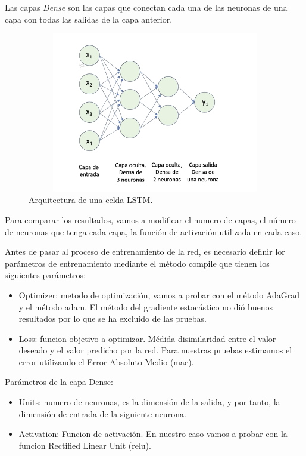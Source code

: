 \documentclass[11pt]{article} %
\begin{document}
Las capas \textit{Dense} son las capas que conectan cada una de las neuronas de una capa con todas las salidas de la capa anterior.

\begin{figure}[h!]
	\centering
	\includegraphics[width=12cm, height=7cm]{imdense1.png}
	\caption{Arquitectura de una celda LSTM.}
\end{figure}

Para comparar los resultados, vamos a modificar el numero de capas, el número de neuronas que tenga cada capa, la función de activación utilizada en cada caso.

Antes de pasar al proceso de entrenamiento de la red, es necesario definir lor parámetros de entrenamiento mediante el método compile que tienen los siguientes parámetros:
\begin{itemize}
	\item Optimizer: metodo de optimización, vamos a probar con el método AdaGrad y el método adam. El método del gradiente estocástico no dió buenos resultados por lo que se ha excluido de las pruebas.
	\item Loss: funcion objetivo a optimizar. Médida disimilaridad entre el valor deseado y el valor predicho por la red. Para nuestras pruebas estimamos el error utilizando el Error Absoluto Medio (mae).
\end{itemize}

Parámetros de la capa Dense:
\begin{itemize}
	\item Units: numero de neuronas, es la dimensión de la salida, y por tanto, la dimensión de entrada de la siguiente neurona.
	\item Activation: Funcion de activación. En nuestro caso vamos a probar con la funcion Rectified Linear Unit (relu).
\end{itemize}
\end{document}
